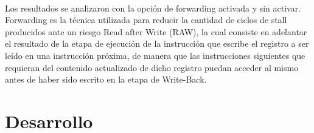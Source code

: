 \documentclass[a4paper,11pt]{article}
\begin{document}
\paragraph{}
Los resultados se analizaron con la opci\'on de forwarding activada y sin activar. 
Forwarding es la t\'ecnica utilizada para reducir la cantidad de ciclos de stall producidos ante un riesgo Read after Write (RAW), la cual consiste en adelantar el resultado de la etapa de ejecuci\'on de la instrucci\'on que escribe el registro a ser le\'ido en una instrucci\'on pr\'oxima, de manera que las instrucciones siguientes que requieran del contenido actualizado de dicho registro puedan acceder al mismo antes de haber sido escrito en la etapa de Write-Back.

\newpage 

\section{Desarrollo}
\end{document}
